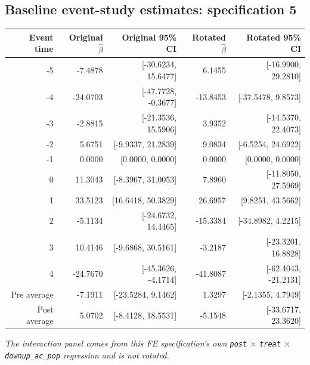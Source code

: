 \documentclass[10pt]{article}
\begin{document}
\subsection*{Baseline event-study estimates: specification 5}
\begin{center}
\scriptsize
\begin{tabular}{r rr rr}
\toprule
Event time & Original $\hat\beta$ & Original 95\% CI & Rotated $\hat\beta$ & Rotated 95\% CI \\
\midrule
-5 & -7.4878 & [-30.6234, 15.6477] & 6.1455 & [-16.9900, 29.2810] \\
-4 & -24.0703 & [-47.7728, -0.3677] & -13.8453 & [-37.5478, 9.8573] \\
-3 & -2.8815 & [-21.3536, 15.5906] & 3.9352 & [-14.5370, 22.4073] \\
-2 & 5.6751 & [-9.9337, 21.2839] & 9.0834 & [-6.5254, 24.6922] \\
-1 & 0.0000 & [0.0000, 0.0000] & 0.0000 & [0.0000, 0.0000] \\
0 & 11.3043 & [-8.3967, 31.0053] & 7.8960 & [-11.8050, 27.5969] \\
1 & 33.5123 & [16.6418, 50.3829] & 26.6957 & [9.8251, 43.5662] \\
2 & -5.1134 & [-24.6732, 14.4465] & -15.3384 & [-34.8982, 4.2215] \\
3 & 10.4146 & [-9.6868, 30.5161] & -3.2187 & [-23.3201, 16.8828] \\
4 & -24.7670 & [-45.3626, -4.1714] & -41.8087 & [-62.4043, -21.2131] \\
\midrule
Pre average & -7.1911 & [-23.5284, 9.1462] & 1.3297 & [-2.1355, 4.7949] \\
Post average & 5.0702 & [-8.4128, 18.5531] & -5.1548 & [-33.6717, 23.3620] \\
\bottomrule
\end{tabular}
\end{center}
\medskip
\textit{The interaction panel comes from this FE specification's own \texttt{post} $\times$ \texttt{treat} $\times$ \texttt{downup\_ac\_pop} regression and is not rotated.}
\clearpage
\end{document}

